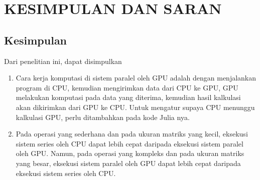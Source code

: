 \chapter{KESIMPULAN DAN SARAN}
\section{Kesimpulan}
Dari penelitian ini, dapat disimpulkan
\begin{enumerate}
	\item Cara kerja komputasi di sistem paralel oleh GPU adalah dengan menjalankan program di CPU, kemudian mengirimkan data dari CPU ke GPU, GPU melakukan komputasi pada data yang diterima, kemudian hasil kalkulasi akan dikirimkan dari GPU ke CPU. Untuk mengatur supaya CPU menunggu kalkulasi GPU, perlu ditambahkan  pada kode Julia nya.
	\item Pada operasi yang sederhana dan pada ukuran matriks yang kecil, eksekusi sistem series oleh CPU dapat lebih cepat daripada eksekusi sistem paralel oleh GPU. Namun, pada operasi yang kompleks dan pada ukuran matriks yang besar, eksekusi sistem paralel oleh GPU dapat lebih cepat daripada eksekusi sistem series oleh CPU.
\end{enumerate}


